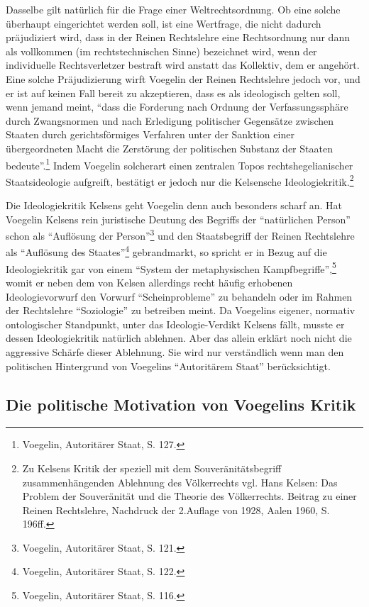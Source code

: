 \documentclass[12pt,a4paper,ngerman]{article}
\begin{document}
Dasselbe gilt natürlich für die Frage einer Weltrechtsordnung. Ob eine solche
überhaupt eingerichtet werden soll, ist eine Wertfrage, die nicht dadurch
präjudiziert wird, dass in der Reinen Rechtslehre eine Rechtsordnung nur dann
als vollkommen (im rechtstechnischen Sinne) bezeichnet wird, wenn der
individuelle Rechtsverletzer bestraft wird anstatt das Kollektiv, dem er
angehört. Eine solche Präjudizierung wirft Voegelin der Reinen Rechtslehre
jedoch vor, und er ist auf keinen Fall bereit zu akzeptieren, dass es als
ideologisch gelten soll, wenn jemand meint, "`dass die Forderung nach Ordnung
der Verfassungssphäre durch Zwangsnormen und nach Erledigung politischer
Gegensätze zwischen Staaten durch gerichtsförmiges Verfahren unter der
Sanktion einer übergeordneten Macht die Zerstörung der politischen Substanz
der Staaten bedeute"'.\footnote{Voegelin, Autoritärer Staat, S. 127.} Indem
Voegelin solcherart einen zentralen Topos rechtshegelianischer Staatsideologie
aufgreift, bestätigt er jedoch nur die Kelsensche Ideologiekritik.\footnote{Zu
  Kelsens Kritik der speziell mit dem Souveränitätsbegriff zusammenhängenden
  Ablehnung des Völkerrechts vgl.  Hans Kelsen: Das Problem der Souveränität
  und die Theorie des Völkerrechts.  Beitrag zu einer Reinen Rechtslehre,
  Nachdruck der 2.Auflage von 1928, Aalen 1960, S. 196ff.}

Die Ideologiekritik Kelsens geht Voegelin denn auch besonders scharf
an. Hat Voegelin Kelsens rein juristische Deutung des Begriffs der
"`natürlichen Person"' schon als "`Auflösung der
Person"'\footnote{Voegelin, Autoritärer Staat, S. 121.} und den
Staatsbegriff der Reinen Rechtslehre als "`Auflösung des
Staates"'\footnote{Voegelin, Autoritärer Staat, S. 122.}
gebrandmarkt, so spricht er in Bezug auf die Ideologiekritik gar von
einem "`System der metaphysischen Kampfbegriffe"',\footnote{Voegelin,
  Autoritärer Staat, S. 116.}  womit er neben dem von Kelsen
allerdings recht häufig erhobenen Ideologievorwurf den Vorwurf
"`Scheinprobleme"' zu behandeln oder im Rahmen der Rechtslehre
"`Soziologie"' zu betreiben meint. Da Voegelins eigener, normativ
ontologischer Standpunkt, unter das Ideologie-Verdikt Kelsens fällt,
musste er dessen Ideologiekritik natürlich ablehnen. Aber das allein
erklärt noch nicht die aggressive Schärfe dieser Ablehnung. Sie wird
nur verständlich wenn man den politischen Hintergrund von Voegelins
"`Autoritärem Staat"' berücksichtigt.

\subsection{Die politische Motivation von Voegelins Kritik}
\end{document}
